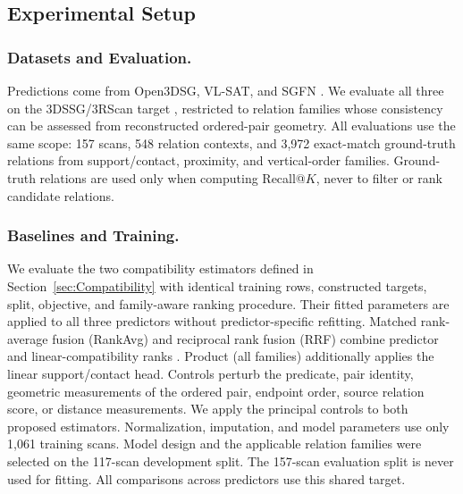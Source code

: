 \subsection{Experimental Setup}
\subsubsection{Datasets and Evaluation.}
Predictions come from Open3DSG, VL-SAT, and SGFN \cite{wang2023vl,koch2024open3dsg,wu2021scenegraphfusion}. We evaluate all three on the 3DSSG/3RScan target \cite{wald2019rio,wald2020learning}, restricted to relation families whose consistency can be assessed from reconstructed ordered-pair geometry. All evaluations use the same scope: 157 scans, 548 relation contexts, and 3,972 exact-match ground-truth relations from support/contact, proximity, and vertical-order families. Ground-truth relations are used only when computing Recall@$K$, never to filter or rank candidate relations. 

\subsubsection{Baselines and Training.}
We evaluate the two compatibility estimators defined in Section~\ref{sec:Compatibility} with identical training rows, constructed targets, split, objective, and family-aware ranking procedure. Their fitted parameters are applied to all three predictors without predictor-specific refitting. Matched rank-average fusion (RankAvg) and reciprocal rank fusion (RRF) combine predictor and linear-compatibility ranks \cite{10.1145/1571941.1572114}. Product (all families) additionally applies the linear support/contact head. Controls perturb the predicate, pair identity, geometric measurements of the ordered pair, endpoint order, source relation score, or distance measurements. We apply the principal controls to both proposed estimators.
Normalization, imputation, and model parameters use only 1,061 training scans. Model design and the applicable relation families were selected on the 117-scan development split. The 157-scan evaluation split is never used for fitting. All comparisons across predictors use this shared target.

